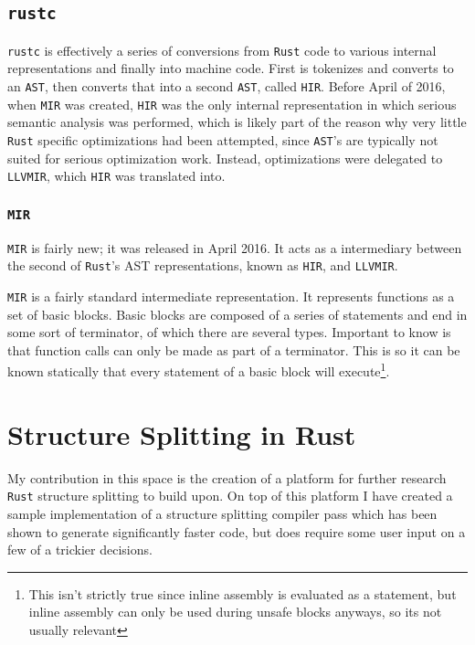 \documentclass[12pt,final]{article}
\newcommand{\rustname}{{\texttt{Rust}}}
\def \rust {\rustname{}\xspace}
\newcommand{\rustcname}{{\texttt{rustc}}}
\def \rustc {\rustcname{}\xspace}
\newcommand{\mirname}{{\texttt{MIR}}}
\def \mir {\mirname{}\xspace}
\newcommand{\hirname}{{\texttt{HIR}}}
\def \hir {\hirname{}\xspace}
\newcommand{\llvmirname}{{\texttt{LLVMIR}}}
\def \llvmir {\llvmirname{}\xspace}
\begin{document}
\subsection{\rustc}
\label{sec:rustc}

\rustc is effectively a series of conversions from
\rust code to various internal representations and finally into machine code.
First is tokenizes and converts to an \texttt{AST}, then converts that into a
second \texttt{AST}, called \hir. Before April of 2016, when \mir was created,
\hir was the only
internal representation in which serious semantic analysis was performed, which
is likely part of the reason why very little \rust specific optimizations had
been attempted, since \texttt{AST}'s are typically not suited for serious
optimization work. Instead, optimizations were delegated to \llvmir, which \hir
was translated into. 

\subsubsection{\mir}
\mir is fairly new; it was released in April 2016\cite{mirintro}. It acts as a
intermediary between the second of \rust's AST representations, known as \hir,
and \llvmir.

\mir is a fairly standard intermediate representation. It represents functions
as a set of basic blocks. Basic blocks are composed of a series of statements
and end in some sort of terminator, of which there are several types. Important
to know is that function calls can only be made as part of a terminator. This is
so it can be known statically that every statement of a basic block will
execute\footnote{This isn't strictly true since inline assembly is evaluated as
  a statement, but inline assembly can only be used during unsafe blocks
  anyways, so its not usually relevant}.

\section{Structure Splitting in Rust}

My contribution in this space is the creation of a platform for further
research \rust structure splitting to build upon. On top of this platform I have
created a sample implementation of a structure splitting compiler pass which
has been shown to generate significantly faster code, but does require some user
input on a few of a trickier decisions. 
\end{document}
